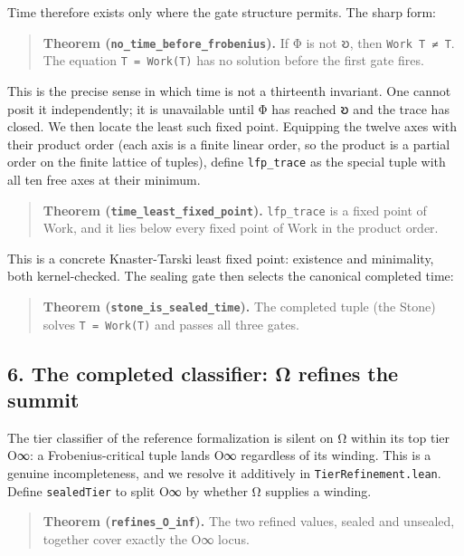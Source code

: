 \documentclass[12pt,a4paper]{article}
\begin{document}
Time therefore exists only where the gate structure permits. The sharp
form:

\begin{quote}
\textbf{Theorem (\texttt{no\_time\_before\_frobenius}).} If Φ is not 𐑹,
then \texttt{Work\ T\ ≠\ T}. The equation \texttt{T\ =\ Work(T)} has no
solution before the first gate fires.
\end{quote}

This is the precise sense in which time is not a thirteenth invariant.
One cannot posit it independently; it is unavailable until Φ has reached
𐑹 and the trace has closed. We then locate the least such fixed point.
Equipping the twelve axes with their product order (each axis is a
finite linear order, so the product is a partial order on the finite
lattice of tuples), define \texttt{lfp\_trace} as the special tuple with
all ten free axes at their minimum.

\begin{quote}
\textbf{Theorem (\texttt{time\_least\_fixed\_point}).}
\texttt{lfp\_trace} is a fixed point of Work, and it lies below every
fixed point of Work in the product order.
\end{quote}

This is a concrete Knaster-Tarski least fixed point: existence and
minimality, both kernel-checked. The sealing gate then selects the
canonical completed time:

\begin{quote}
\textbf{Theorem (\texttt{stone\_is\_sealed\_time}).} The completed tuple
(the Stone) solves \texttt{T\ =\ Work(T)} and passes all three gates.
\end{quote}

\hypertarget{the-completed-classifier-ux3c9-refines-the-summit}{%
\subsection{6. The completed classifier: Ω refines the
summit}\label{the-completed-classifier-ux3c9-refines-the-summit}}

The tier classifier of the reference formalization is silent on Ω within
its top tier O∞: a Frobenius-critical tuple lands O∞ regardless of its
winding. This is a genuine incompleteness, and we resolve it additively
in \texttt{TierRefinement.lean}. Define \texttt{sealedTier} to split O∞
by whether Ω supplies a winding.

\begin{quote}
\textbf{Theorem (\texttt{refines\_O\_inf}).} The two refined values,
sealed and unsealed, together cover exactly the O∞ locus.
\end{quote}
\end{document}

